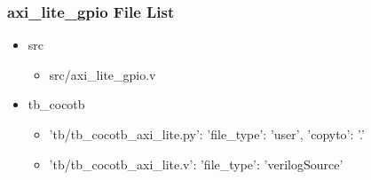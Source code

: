 \subsubsection{axi\_lite\_gpio File List}
\begin{itemize}
\item src
	\begin{itemize}
	\item src/axi\_lite\_gpio.v
	\end{itemize}
\item tb\_cocotb
	\begin{itemize}
	\item {'tb/tb\_cocotb\_axi\_lite.py': {'file\_type': 'user', 'copyto': '.'}}
	\item {'tb/tb\_cocotb\_axi\_lite.v': {'file\_type': 'verilogSource'}}
	\end{itemize}
\end{itemize}
